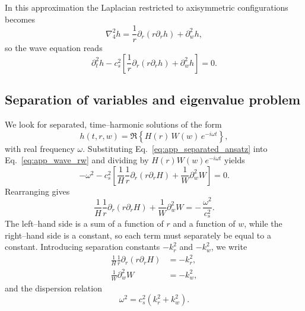 \documentclass[12pt]{article}
\begin{document}
In this approximation the Laplacian restricted to axisymmetric configurations
becomes
\begin{equation}
  \nabla_4^2 h
  = \frac{1}{r}\partial_r\!\left(r\partial_r h\right)
    + \partial_w^2 h,
  \label{eq:app_laplacian}
\end{equation}
so the wave equation reads
\begin{equation}
  \partial_t^2 h
  - c_s^2
    \left[
      \frac{1}{r}\partial_r\!\left(r\partial_r h\right)
      + \partial_w^2 h
    \right]
  = 0.
  \label{eq:app_wave_rw}
\end{equation}

\subsection{Separation of variables and eigenvalue problem}

We look for separated, time--harmonic solutions of the form
\begin{equation}
  h(t,r,w)
  = \Re\!\left\{
      H(r)\,W(w)\,e^{-i\omega t}
    \right\},
  \label{eq:app_separated_ansatz}
\end{equation}
with real frequency $\omega$.  Substituting
Eq.~\eqref{eq:app_separated_ansatz} into Eq.~\eqref{eq:app_wave_rw} and
dividing by $H(r)W(w)e^{-i\omega t}$ yields
\begin{equation}
  -\omega^2
  - c_s^2
    \left[
      \frac{1}{H}
      \frac{1}{r}\partial_r\!\left(r\partial_r H\right)
      + \frac{1}{W}\partial_w^2 W
    \right]
  = 0.
\end{equation}
Rearranging gives
\begin{equation}
  \frac{1}{H}
  \frac{1}{r}\partial_r\!\left(r\partial_r H\right)
  + \frac{1}{W}\partial_w^2 W
  = -\,\frac{\omega^2}{c_s^2}.
  \label{eq:app_separation_eq}
\end{equation}
The left--hand side is a sum of a function of $r$ and a function of $w$,
while the right--hand side is a constant, so each term must separately be
equal to a constant.  Introducing separation constants $-k_r^2$ and
$-k_w^2$, we write
\begin{align}
  \frac{1}{H}
  \frac{1}{r}\partial_r\!\left(r\partial_r H\right)
  &= -k_r^2,
  \label{eq:app_radial_eq_pre}
  \\
  \frac{1}{W}\partial_w^2 W
  &= -k_w^2,
  \label{eq:app_axial_eq_pre}
\end{align}
and the dispersion relation
\begin{equation}
  \omega^2
  = c_s^2(k_r^2 + k_w^2).
  \label{eq:app_dispersion}
\end{equation}
\end{document}
